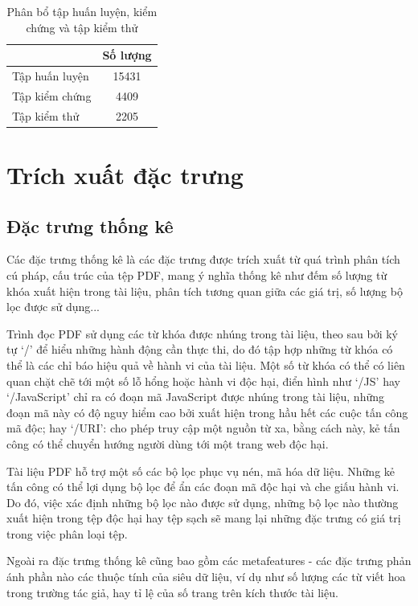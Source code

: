 \documentclass[./../main.tex]{subfiles}
\begin{document}
\begin{table}[]
	\centering
	\caption{Phân bổ tập huấn luyện, kiểm chứng và tập kiểm thử}
	\label{tab:phan_bo_tap_huan_luyen}
	\begin{tabular}{|l|c|}
		\hline
		               & Số lượng \\ \hline
		Tập huấn luyện & 15431    \\ \hline
		Tập kiểm chứng & 4409     \\ \hline
		Tập kiểm thử   & 2205     \\ \hline
	\end{tabular}
\end{table}

\section{Trích xuất đặc trưng}
\subsection{Đặc trưng thống kê}
Các đặc trưng thống kê là các đặc trưng được trích xuất từ quá trình phân tích cú pháp, cấu trúc của tệp PDF, mang ý nghĩa thống kê như đếm số lượng từ khóa xuất hiện trong tài liệu, phân tích tương quan giữa các giá trị, số lượng bộ lọc được sử dụng...

Trình đọc PDF sử dụng các từ khóa được nhúng trong tài liệu, theo sau bởi ký tự ‘\slash’ để hiểu những hành động cần thực thi, do đó tập hợp những từ khóa có thể là các chỉ báo hiệu quả về hành vi của tài liệu. Một số từ khóa có thể có liên quan chặt chẽ tới một số lỗ hổng hoặc hành vi độc hại, điển hình như ‘\slash JS’ hay ‘\slash JavaScript’ chỉ ra có đoạn mã JavaScript được nhúng trong tài liệu, những đoạn mã này có độ nguy hiểm cao bởi xuất hiện trong hầu hết các cuộc tấn công mã độc; hay ‘\slash URI’: cho phép truy cập một nguồn từ xa, bằng cách này, kẻ tấn công có thể chuyển hướng người dùng tới một trang web độc hại.

Tài liệu PDF hỗ trợ một số các bộ lọc phục vụ nén, mã hóa dữ liệu. Những kẻ tấn công có thể lợi dụng bộ lọc để ẩn các đoạn mã độc hại và che giấu hành vi. Do đó, việc xác định những bộ lọc nào được sử dụng, những bộ lọc nào thường xuất hiện trong tệp độc hại hay tệp sạch sẽ mang lại những đặc trưng có giá trị trong việc phân loại tệp.

Ngoài ra đặc trưng thống kê cũng bao gồm các metafeatures - các đặc trưng phản ánh phần nào các thuộc tính của siêu dữ liệu, ví dụ như số lượng các từ viết hoa trong trường tác giả, hay tỉ lệ của số trang trên kích thước tài liệu.
\end{document}
